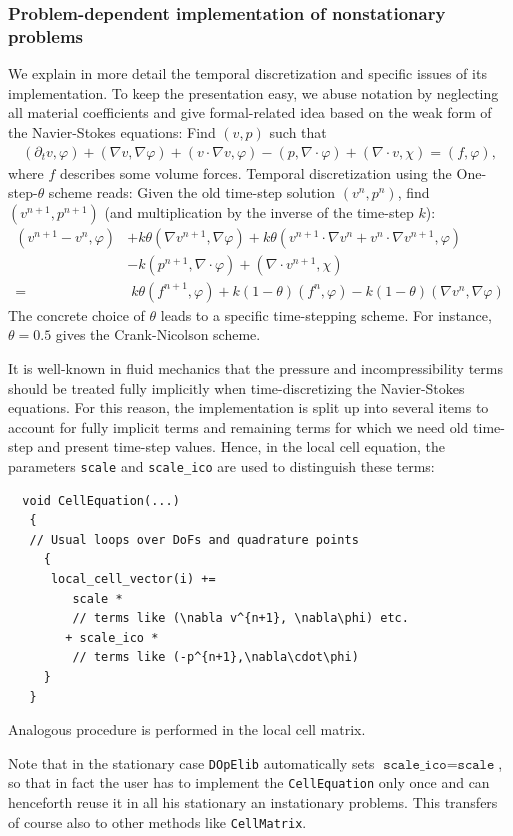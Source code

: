 \documentclass[smallextended]{svjour3}       %
\numberwithin{equation}{section}
\renewcommand{\phi}{\varphi}
\newcommand{\dope}{\texttt{DOpElib}}
\begin{document}
\subsubsection{Problem-dependent 
implementation of nonstationary problems}
\label{sec:timedep:implementation}
We explain in more detail the temporal discretization
and specific issues of its implementation. 
To keep the presentation easy, we abuse notation 
by neglecting
all material coefficients
and give formal-related idea based on the weak 
form of the Navier-Stokes equations:
Find $(v,p)$ such that
\begin{align*}
(\partial_t v,\phi) 
+ (\nabla v, \nabla \phi)
+ (v\cdot\nabla v,\phi)
-(p,\nabla\cdot \phi)
+(\nabla\cdot v, \chi)
=(f,\phi),
\end{align*}
where $f$ describes some volume forces.
Temporal discretization using the One-step-$\theta$ scheme reads:
Given the old time-step solution $(v^n,p^n)$, 
find $(v^{n+1}, p^{n+1})$ (and multiplication 
by the inverse of the time-step $k$):
\begin{align*}
(v^{n+1} - v^{n}, \phi)
&+ k\theta (\nabla v^{n+1}, \nabla \phi)
+ k\theta (v^{n+1}\cdot\nabla v^n + 
  v^{n}\cdot\nabla v^{n+1},\phi)\\
&- k (p^{n+1},\nabla\cdot \phi)
+ (\nabla\cdot v^{n+1}, \chi)\\
=&\; k\theta (f^{n+1},\phi) + k(1-\theta) (f^{n},\phi)
- k(1-\theta) (\nabla v^{n}, \nabla \phi) 
\end{align*}
The concrete choice of $\theta$ leads to a
specific time-stepping scheme. For instance,
$\theta = 0.5$ gives the Crank-Nicolson scheme.

It is well-known in fluid mechanics that the pressure and incompressibility terms should be 
treated fully implicitly when time-discretizing 
the Navier-Stokes equations.
For this reason, the implementation is split up
into several items to account for fully implicit 
terms and remaining terms for which we need 
old time-step and present time-step values. 
Hence, in the local cell equation, the parameters
\texttt{scale} and \texttt{scale\_ico}
are used to distinguish these terms:
\begin{lstlisting}
  void CellEquation(...)
   {
   // Usual loops over DoFs and quadrature points
     {
      local_cell_vector(i) += 
         scale * 
         // terms like (\nabla v^{n+1}, \nabla\phi) etc.
        + scale_ico *
         // terms like (-p^{n+1},\nabla\cdot\phi)
     }
   }
\end{lstlisting}
Analogous procedure is performed in the local 
cell matrix.
\begin{remark}
Note that in the stationary case \dope{} automatically sets $ \texttt{scale\_ico} = \texttt{scale}$, so that in fact the user has to implement the \texttt{CellEquation} only once and can henceforth reuse it in all his stationary an instationary problems. This transfers of course also to other methods like \texttt{CellMatrix}.
\end{remark}
\end{document}
